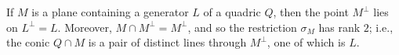If $M$ is a plane containing a generator $L$ of a quadric $Q$, then the point $M^\perp$ lies on $L^\perp = L$. Moreover, $M \cap M^\perp = M^\perp$, and so the restriction $\sigma_M$ has rank $2$; i.e., the conic $Q \cap M$ is a pair of distinct lines through $M^\perp$, one of which is $L$.
